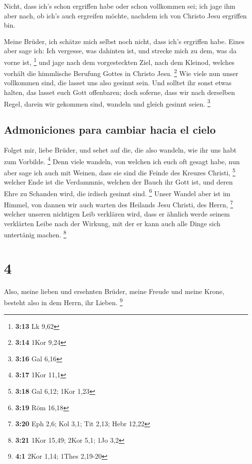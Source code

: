  Nicht, dass ich's schon ergriffen habe oder schon
vollkommen sei; ich jage ihm aber nach, ob ich's auch ergreifen möchte,
nachdem ich von Christo Jesu ergriffen bin.

 Meine Brüder, ich schätze mich selbst noch nicht, dass
ich's ergriffen habe. Eines aber sage ich: Ich vergesse, was dahinten
ist, und strecke mich zu dem, was da vorne ist, \footnote{\textbf{3:13}
  Lk 9,62}  und jage nach dem vorgesteckten Ziel, nach
dem Kleinod, welches vorhält die himmlische Berufung Gottes in Christo
Jesu. \footnote{\textbf{3:14} 1Kor 9,24}  Wie viele nun
unser vollkommen sind, die lasset uns also gesinnt sein. Und solltet ihr
sonst etwas halten, das lasset euch Gott offenbaren; 
doch soferne, dass wir nach derselben Regel, darein wir gekommen sind,
wandeln und gleich gesinnt seien. \footnote{\textbf{3:16} Gal 6,16}

\hypertarget{admoniciones-para-cambiar-hacia-el-cielo}{%
\subsection{Admoniciones para cambiar hacia el
cielo}\label{admoniciones-para-cambiar-hacia-el-cielo}}

 Folget mir, liebe Brüder, und sehet auf die, die also
wandeln, wie ihr uns habt zum Vorbilde. \footnote{\textbf{3:17} 1Kor
  11,1}  Denn viele wandeln, von welchen ich euch oft
gesagt habe, nun aber sage ich auch mit Weinen, dass sie sind die Feinde
des Kreuzes Christi, \footnote{\textbf{3:18} Gal 6,12; 1Kor 1,23}
 welcher Ende ist die Verdammnis, welchen der Bauch ihr
Gott ist, und deren Ehre zu Schanden wird, die irdisch gesinnt sind.
\footnote{\textbf{3:19} Röm 16,18}  Unser Wandel aber ist
im Himmel, von dannen wir auch warten des Heilands Jesu Christi, des
Herrn, \footnote{\textbf{3:20} Eph 2,6; Kol 3,1; Tit 2,13; Hebr 12,22}
 welcher unseren nichtigen Leib verklären wird, dass er
ähnlich werde seinem verklärten Leibe nach der Wirkung, mit der er kann
auch alle Dinge sich untertänig machen. \footnote{\textbf{3:21} 1Kor
  15,49; 2Kor 5,1; 1Jo 3,2}

\hypertarget{section-3}{%
\section{4}\label{section-3}}

 Also, meine lieben und ersehnten Brüder, meine Freude und
meine Krone, besteht also in dem Herrn, ihr Lieben. \footnote{\textbf{4:1}
  2Kor 1,14; 1Thes 2,19-20}

